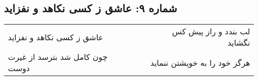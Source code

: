 \begin{center}
\section*{شماره ۹: عاشق ز کسی نکاهد و نفزاید}
\label{sec:009}
\begin{longtable}{l p{0.5cm} r}
عاشق ز کسی نکاهد و نفزاید
&&
لب بندد و راز پیش کس نگشاید
\\
چون کامل شد بترسد از غیرت دوست
&&
هرگز خود را به خویشتن ننماید
\\
\end{longtable}
\end{center}
